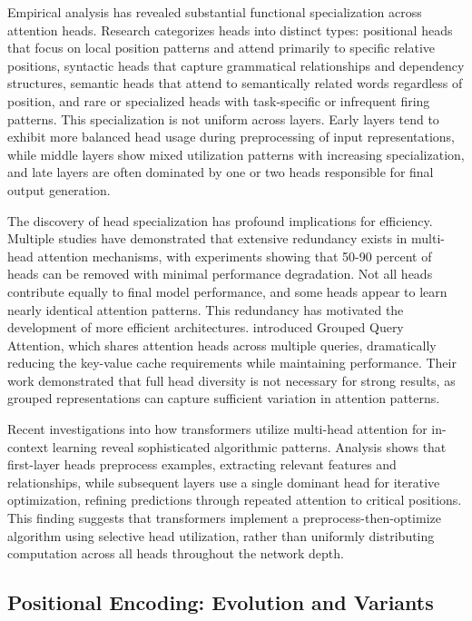 Empirical analysis has revealed substantial functional specialization across attention heads. Research categorizes heads into distinct types: positional heads that focus on local position patterns and attend primarily to specific relative positions, syntactic heads that capture grammatical relationships and dependency structures, semantic heads that attend to semantically related words regardless of position, and rare or specialized heads with task-specific or infrequent firing patterns. This specialization is not uniform across layers. Early layers tend to exhibit more balanced head usage during preprocessing of input representations, while middle layers show mixed utilization patterns with increasing specialization, and late layers are often dominated by one or two heads responsible for final output generation.

The discovery of head specialization has profound implications for efficiency. Multiple studies have demonstrated that extensive redundancy exists in multi-head attention mechanisms, with experiments showing that 50-90 percent of heads can be removed with minimal performance degradation. Not all heads contribute equally to final model performance, and some heads appear to learn nearly identical attention patterns. This redundancy has motivated the development of more efficient architectures. \citet{ainslie2023gqa} introduced Grouped Query Attention, which shares attention heads across multiple queries, dramatically reducing the key-value cache requirements while maintaining performance. Their work demonstrated that full head diversity is not necessary for strong results, as grouped representations can capture sufficient variation in attention patterns.

Recent investigations into how transformers utilize multi-head attention for in-context learning reveal sophisticated algorithmic patterns. Analysis shows that first-layer heads preprocess examples, extracting relevant features and relationships, while subsequent layers use a single dominant head for iterative optimization, refining predictions through repeated attention to critical positions. This finding suggests that transformers implement a preprocess-then-optimize algorithm using selective head utilization, rather than uniformly distributing computation across all heads throughout the network depth.

\subsection{Positional Encoding: Evolution and Variants}

